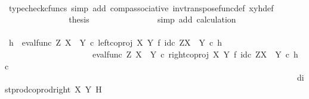 \begin{isabellebody}
\ \ \ \ \ \ \ \ \ \ \ \ \ \ \isamarkupfalse%
\ {\isacharparenleft}{\kern0pt}typecheck{\isacharunderscore}{\kern0pt}cfuncs{\isacharcomma}{\kern0pt}\ simp\ add{\isacharcolon}{\kern0pt}\ comp{\isacharunderscore}{\kern0pt}associative{}\ inv{\isacharunderscore}{\kern0pt}transpose{\isacharunderscore}{\kern0pt}func{\isacharunderscore}{\kern0pt}def{}\ xyh{\isacharunderscore}{\kern0pt}def{\isacharparenright}{\kern0pt}\isanewline
\ \ \ \ \ \ \ \ \ \ \ \ \isamarkupfalse%
\ \isamarkupfalse%
\ {\isacharquery}{\kern0pt}thesis\isanewline
\ \ \ \ \ \ \ \ \ \ \ \ \ \ \isamarkupfalse%
\ {\isacharparenleft}{\kern0pt}simp\ add{\isacharcolon}{\kern0pt}\ calculation{\isacharparenright}{\kern0pt}\isanewline
\ \ \ \ \ \ \ \ \ \ \isamarkupfalse%
\isanewline
\ \ \ \ \ \ \ \ \isamarkupfalse%
\isanewline
\ \ \ \ \ \ \isamarkupfalse%
\isanewline
\ \ \ \ \ \ \isamarkupfalse%
\ \isamarkupfalse%
\ {\isachardoublequoteopen}h\ {\isacharequal}{\kern0pt}\ {\isacharparenleft}{\kern0pt}{\isacharparenleft}{\kern0pt}{\isacharparenleft}{\kern0pt}eval{\isacharunderscore}{\kern0pt}func\ Z\ {\isacharparenleft}{\kern0pt}X\ {\isasymCoprod}\ Y{\isacharparenright}{\kern0pt}\ {\isasymcirc}\isactrlsub c\ left{\isacharunderscore}{\kern0pt}coproj\ X\ Y\ {\isasymtimes}\isactrlsub f\ id\isactrlsub c\ {\isacharparenleft}{\kern0pt}Z\isactrlbsup {\isacharparenleft}{\kern0pt}X\ {\isasymCoprod}\ Y{\isacharparenright}{\kern0pt}\isactrlesup {\isacharparenright}{\kern0pt}{\isacharparenright}{\kern0pt}\isactrlsup {\isasymsharp}\ {\isasymcirc}\isactrlsub c\ h{\isacharparenright}{\kern0pt}\isactrlsup {\isasymflat}\ {\isasymamalg}\isanewline
\ \ \ \ \ \ \ \ \ \ \ \ \ \ \ \ \ \ \ \ \ {\isacharparenleft}{\kern0pt}{\isacharparenleft}{\kern0pt}eval{\isacharunderscore}{\kern0pt}func\ Z\ {\isacharparenleft}{\kern0pt}X\ {\isasymCoprod}\ Y{\isacharparenright}{\kern0pt}\ {\isasymcirc}\isactrlsub c\ right{\isacharunderscore}{\kern0pt}coproj\ X\ Y\ {\isasymtimes}\isactrlsub f\ id\isactrlsub c\ {\isacharparenleft}{\kern0pt}Z\isactrlbsup {\isacharparenleft}{\kern0pt}X\ {\isasymCoprod}\ Y{\isacharparenright}{\kern0pt}\isactrlesup {\isacharparenright}{\kern0pt}{\isacharparenright}{\kern0pt}\isactrlsup {\isasymsharp}\ {\isasymcirc}\isactrlsub c\ h{\isacharparenright}{\kern0pt}\isactrlsup {\isasymflat}\ {\isasymcirc}\isactrlsub c\isanewline
\ \ \ \ \ \ \ \ \ \ \ \ \ \ \ \ \ \ \ \ \ \ \ \ \ \ \ \ \ \ \ \ \ \ \ \ \ \ \ \ \ \ \ \ \ \ \ \ \ \ \ \ \ \ \ \ \ \ \ \ \ \ \ \ \ \ \ \ \ \ dist{\isacharunderscore}{\kern0pt}prod{\isacharunderscore}{\kern0pt}coprod{\isacharunderscore}{\kern0pt}right\ X\ Y\ H{\isacharparenright}{\kern0pt}\isactrlsup {\isasymsharp}{\isachardoublequoteclose}\isanewline

\end{isabellebody}

